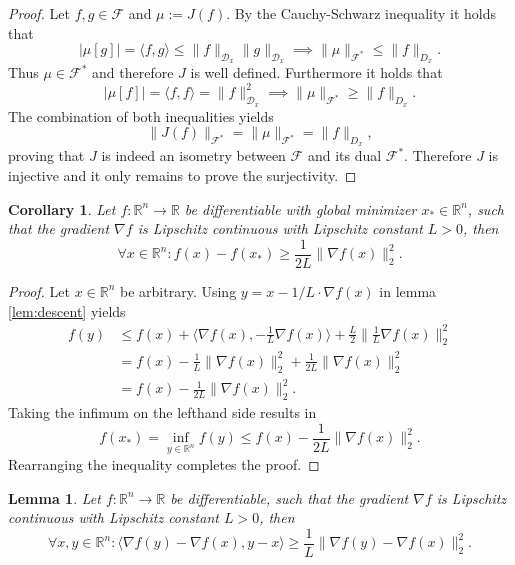 \documentclass[11pt, a4paper]{article}
\newtheorem{lemma}[theorem]{Lemma}
\newtheorem{corollary}[theorem]{Corollary}
\newcommand{\R}{\mathds{R}}
\newcommand{\D}{\mathcal{D}}
\newcommand{\F}{\mathcal{F}}
\begin{document}
\begin{proof}
Let $f, g \in \F$ and $\mu := J(f)$. By the Cauchy-Schwarz inequality it holds that
\[ \big | \mu[g] \big | = \langle f,g \rangle \leq \big \| f \big \|_{\D_x} \big \| g \big \|_{\D_x} \implies \big \| \mu \big \|_{\F^*} \le \big \| f \big \|_{D_x}. \]
Thus $\mu \in \F^*$ and therefore $J$ is well defined. Furthermore it holds that 
\[ \big | \mu[f] \big | = \langle f,f \rangle = \big \| f \big \|_{\D_x}^2 \implies \big \| \mu \big \|_{\F^*} \ge \big \| f \big \|_{D_x}. \]
The combination of both inequalities yields
\[ \big \| J(f) \big \|_{\F^*} = \big \| \mu \big \|_{\F^*} = \big \| f \big \|_{D_x}, \]
proving that $J$ is indeed an isometry between $\F$ and its dual $\F^*$. Therefore $J$ is injective and it only remains to prove the surjectivity.
\end{proof}

\begin{corollary} \label{cor:descent}
Let $f: \R^n \to \R$ be differentiable with global minimizer $x_* \in \R^n$, such that the gradient $\nabla f$ is Lipschitz continuous with Lipschitz constant $L >0$, then
\[ \forall x \in \R^n : f(x) - f(x_*) \geq \frac{1}{2L} \big \| \nabla f(x) \big \|_2^2. \]
\end{corollary}

\begin{proof}
Let $x \in \R^n$ be arbitrary. Using $y = x - 1/L \cdot \nabla f(x)$ in lemma \ref{lem:descent} yields
\[ \begin{split} 
f(y) 
&\leq f(x) + \big \langle \nabla f(x) , - \frac{1}{L} \nabla f(x) \big \rangle + \frac{L}{2} \big \| \frac{1}{L} \nabla f(x) \big \|_2^2 \\\
&= f(x) - \frac{1}{L} \big \| \nabla f(x) \big \|_2^2 + \frac{1}{2L} \big \| \nabla f(x) \big \|_2^2 \\\
&= f(x) - \frac{1}{2L} \big \| \nabla f(x) \big \|_2^2.
\end{split} \]
Taking the infimum on the lefthand side results in
\[ f(x_*) = \inf_{y \in \R^n} f(y) \leq f(x) - \frac{1}{2L} \big \| \nabla f(x) \big \|_2^2. \]
Rearranging the inequality completes the proof.
\end{proof}

\begin{lemma} \label{lem:coercivity}
Let $f: \R^n \to \R$ be differentiable, such that the gradient $\nabla f$ is Lipschitz continuous with Lipschitz constant $L>0$, then
\[ \forall x,y \in \R^n : \big \langle \nabla f(y) - \nabla f(x),y-x \big \rangle \geq \frac{1}{L} \big \| \nabla f(y) - \nabla f(x) \big \|_2^2. \]
\end{lemma}
\end{document}
